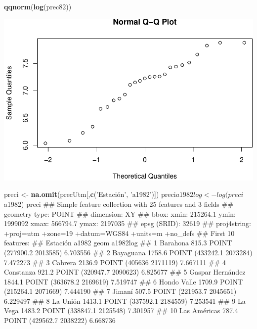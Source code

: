 \documentclass[11pt,]{article}
\newenvironment{Shaded}{\begin{snugshade}}{\end{snugshade}}
\newcommand{\KeywordTok}[1]{\textcolor[rgb]{0.13,0.29,0.53}{\textbf{#1}}}
\newcommand{\StringTok}[1]{\textcolor[rgb]{0.31,0.60,0.02}{#1}}
\newcommand{\NormalTok}[1]{#1}
\begin{document}
\begin{Shaded}
\begin{Highlighting}[]
\KeywordTok{qqnorm}\NormalTok{(}\KeywordTok{log}\NormalTok{(prec82))}
\end{Highlighting}
\end{Shaded}

\includegraphics[width=1\linewidth]{img/unnamed-chunk-12-4}

\begin{Shaded}
\begin{Highlighting}[]

\NormalTok{preci <-}\StringTok{ }\KeywordTok{na.omit}\NormalTok{(precUtm[,}\KeywordTok{c}\NormalTok{(}\StringTok{'Estación', '}\NormalTok{a1982}\StringTok{')])}
\StringTok{preci$a1982log <- log(preci$a1982)}
\StringTok{preci}
\StringTok{## Simple feature collection with 25 features and 3 fields}
\StringTok{## geometry type:  POINT}
\StringTok{## dimension:      XY}
\StringTok{## bbox:           xmin: 215264.1 ymin: 1999092 xmax: 566794.7 ymax: 2197035}
\StringTok{## epsg (SRID):    32619}
\StringTok{## proj4string:    +proj=utm +zone=19 +datum=WGS84 +units=m +no_defs}
\StringTok{## First 10 features:}
\StringTok{##            Estación  a1982                     geom a1982log}
\StringTok{## 1          Barahona  815.3 POINT (277900.2 2013585) 6.703556}
\StringTok{## 2         Bayaguana 1758.6 POINT (433242.1 2073284) 7.472273}
\StringTok{## 3           Cabrera 2136.9   POINT (405636 2171119) 7.667111}
\StringTok{## 4         Constanza  921.2 POINT (320947.7 2090623) 6.825677}
\StringTok{## 5  Gaspar Hernández 1844.1 POINT (363678.2 2169619) 7.519747}
\StringTok{## 6       Hondo Valle 1709.9 POINT (215264.1 2071669) 7.444190}
\StringTok{## 7            Jimaní  507.5 POINT (221953.7 2045651) 6.229497}
\StringTok{## 8          La Unión 1413.1 POINT (337592.1 2184559) 7.253541}
\StringTok{## 9           La Vega 1483.2 POINT (338847.1 2125548) 7.301957}
\StringTok{## 10     Las Américas  787.4 POINT (429562.7 2038222) 6.668736}
\end{Highlighting}
\end{Shaded}
\end{document}
